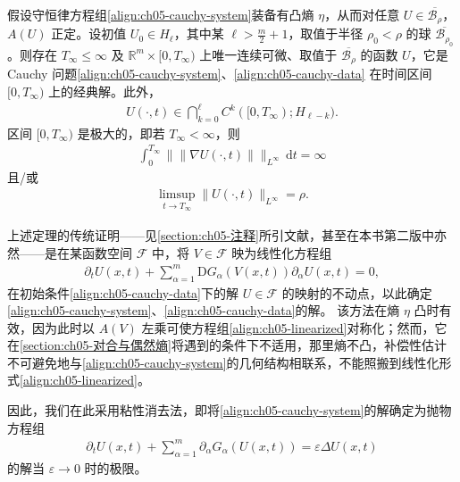 \documentclass[../../main.tex]{subfiles}
\begin{document}
\begin{theorem}\label{theorem:ch05-凸熵局部存在}
假设守恒律方程组\eqref{align:ch05-cauchy-system}装备有凸熵 $\eta$，从而对任意 $U\in\overline{\mathscr{B}_{\rho}}$，$A(U)$ 正定。设初值 $U_{0}\in H_{\ell}$，其中某 $\ell>\frac{m}{2}+1$，取值于半径 $\rho_{0}<\rho$ 的球 $\overline{\mathscr{B}_{\rho_{0}}}$。则存在 $T_{\infty}\leqslant\infty$ 及 $\mathbb{R}^{m}\times[0,T_{\infty})$ 上唯一连续可微、取值于 $\overline{\mathscr{B}_{\rho}}$ 的函数 $U$，它是 Cauchy 问题\eqref{align:ch05-cauchy-system}、\eqref{align:ch05-cauchy-data} 在时间区间 $[0,T_{\infty})$ 上的经典解。此外，
\begin{align}
U(\cdot,t)\in\bigcap_{k=0}^{\ell}C^{k}([0,T_{\infty});H_{\ell-k}).\label{align:ch05-regularity}
\end{align}
区间 $[0,T_{\infty})$ 是极大的，即若 $T_{\infty}<\infty$，则
\begin{align}
\int_{0}^{T_{\infty}}\|\|\nabla U(\cdot,t)\|\|_{L^{\infty}}\,\mathrm{d}t=\infty\label{align:ch05-blowup1}
\end{align}
且/或
\begin{align}
\limsup_{t\to T_{\infty}}\|U(\cdot,t)\|_{L^{\infty}}=\rho.\label{align:ch05-blowup2}
\end{align}
\end{theorem}

上述定理的传统证明——见\cref{section:ch05-注释}所引文献，甚至在本书第二版中亦然——是在某函数空间 $\mathscr{F}$ 中，将 $V\in\mathscr{F}$ 映为线性化方程组
\begin{align}
\partial_{t}U(x,t)+\sum_{\alpha=1}^{m}\mathrm{D}G_{\alpha}(V(x,t))\partial_{\alpha}U(x,t)=0,\label{align:ch05-linearized}
\end{align}
在初始条件\eqref{align:ch05-cauchy-data}下的解 $U\in\mathscr{F}$ 的映射的不动点，以此确定\eqref{align:ch05-cauchy-system}、\eqref{align:ch05-cauchy-data}的解。
该方法在熵 $\eta$ 凸时有效，因为此时以 $A(V)$ 左乘可使方程组\eqref{align:ch05-linearized}对称化；然而，它在\cref{section:ch05-对合与偶然熵}将遇到的条件下不适用，那里熵不凸，补偿性估计不可避免地与\eqref{align:ch05-cauchy-system}的几何结构相联系，不能照搬到线性化形式\eqref{align:ch05-linearized}。

因此，我们在此采用粘性消去法，即将\eqref{align:ch05-cauchy-system}的解确定为抛物方程组
\begin{align}
\partial_{t}U(x,t)+\sum_{\alpha=1}^{m}\partial_{\alpha}G_{\alpha}(U(x,t))=\varepsilon\Delta U(x,t)\label{align:ch05-parabolic}
\end{align}
的解当 $\varepsilon\to0$ 时的极限。
\end{document}
